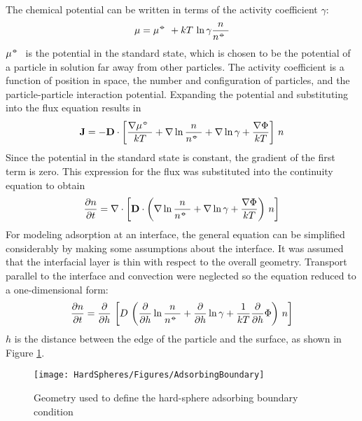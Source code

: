 The chemical potential can be written in terms of the activity coefficient
$\gamma$:\begin{equation} \label{eq:ChemicalPotential}
\mu = \mu^\standardstate + kT \, \ln \gamma \frac{n}{n^ \standardstate}
\end{equation}\( \mu^\standardstate \) is the potential in the standard state,
which is chosen to be the potential of a particle in solution far
away from other particles. The activity coefficient is a function
of position in space, the number and configuration of particles, and
the particle-particle interaction potential. Expanding the potential
and substituting into the flux equation results in \begin{equation} \label{eq:Flux ito Potential}
\mathbf{J} = -\mathbf{D} \cdot \left[ \frac{\nabla \mu^\standardstate}{kT}
 + \nabla \ln \frac{n}{n^\standardstate} + \nabla \ln \gamma
 + \frac{\nabla \Phi}{kT}
 \right] \, n
\end{equation}Since the potential in the standard state is constant, the gradient
of the first term is zero. This expression for the flux was substituted
into the continuity equation to obtain\begin{equation} \label{eq:PDE 1}
\frac{\partial n}{ \partial t} =
 \nabla \cdot \left[ \mathbf{D} \cdot \left(
 \nabla \ln \frac{n}{n^\standardstate}
 + \nabla \ln \gamma + \frac{\nabla \Phi}{kT}
 \right) \, n \right]
\end{equation}For modeling adsorption at an interface, the general equation can
be simplified considerably by making some assumptions about the interface.
It was assumed that the interfacial layer is thin with respect to
the overall geometry. Transport parallel to the interface and convection
were neglected so the equation reduced to a one-dimensional form:\begin{equation} \label{eq:PDE 2}
\frac{\partial n}{ \partial t} =
 \frac{\partial}{ \partial h} \, \left[ D \, 
 \left(
 \frac{\partial}{ \partial h} \ln \frac{n}{n^\standardstate} 
 + \frac{\partial}{ \partial h} \ln \gamma
 + \frac{1}{kT} \frac{\partial}{ \partial h} \Phi
 \right) \, n \right]
\end{equation}$h$ is the distance between the edge of the particle and the surface,
as shown in Figure \ref{fig:Geometry}. %
\begin{figure}
\texttt{[image: HardSpheres/Figures/AdsorbingBoundary]}

\caption{\label{fig:Geometry}Geometry used to define the hard-sphere adsorbing
boundary condition}


%
\end{figure}


